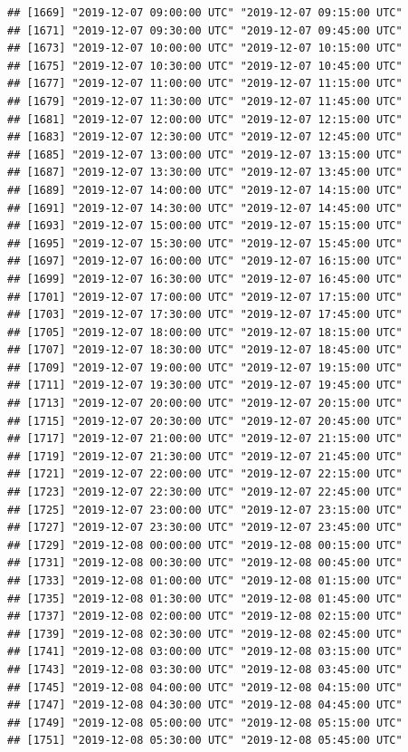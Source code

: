 \documentclass{article}\usepackage[]{graphicx}\usepackage[]{color}
\makeatletter
\newenvironment{kframe}{%
 \def\at@end@of@kframe{}%
 \ifinner\ifhmode%
  \def\at@end@of@kframe{\end{minipage}}%
  \begin{minipage}{\columnwidth}%
 \fi\fi%
 \def\FrameCommand##1{\hskip\@totalleftmargin \hskip-\fboxsep
 \colorbox{shadecolor}{##1}\hskip-\fboxsep
     \hskip-\linewidth \hskip-\@totalleftmargin \hskip\columnwidth}%
 \MakeFramed {\advance\hsize-\width
   \@totalleftmargin\z@ \linewidth\hsize
   \@setminipage}}%
 {\par\unskip\endMakeFramed%
 \at@end@of@kframe}
\newenvironment{knitrout}{}{} %
\makeatother
\begin{document}
\begin{knitrout}
\begin{kframe}
\begin{verbatim}
## [1669] "2019-12-07 09:00:00 UTC" "2019-12-07 09:15:00 UTC"
## [1671] "2019-12-07 09:30:00 UTC" "2019-12-07 09:45:00 UTC"
## [1673] "2019-12-07 10:00:00 UTC" "2019-12-07 10:15:00 UTC"
## [1675] "2019-12-07 10:30:00 UTC" "2019-12-07 10:45:00 UTC"
## [1677] "2019-12-07 11:00:00 UTC" "2019-12-07 11:15:00 UTC"
## [1679] "2019-12-07 11:30:00 UTC" "2019-12-07 11:45:00 UTC"
## [1681] "2019-12-07 12:00:00 UTC" "2019-12-07 12:15:00 UTC"
## [1683] "2019-12-07 12:30:00 UTC" "2019-12-07 12:45:00 UTC"
## [1685] "2019-12-07 13:00:00 UTC" "2019-12-07 13:15:00 UTC"
## [1687] "2019-12-07 13:30:00 UTC" "2019-12-07 13:45:00 UTC"
## [1689] "2019-12-07 14:00:00 UTC" "2019-12-07 14:15:00 UTC"
## [1691] "2019-12-07 14:30:00 UTC" "2019-12-07 14:45:00 UTC"
## [1693] "2019-12-07 15:00:00 UTC" "2019-12-07 15:15:00 UTC"
## [1695] "2019-12-07 15:30:00 UTC" "2019-12-07 15:45:00 UTC"
## [1697] "2019-12-07 16:00:00 UTC" "2019-12-07 16:15:00 UTC"
## [1699] "2019-12-07 16:30:00 UTC" "2019-12-07 16:45:00 UTC"
## [1701] "2019-12-07 17:00:00 UTC" "2019-12-07 17:15:00 UTC"
## [1703] "2019-12-07 17:30:00 UTC" "2019-12-07 17:45:00 UTC"
## [1705] "2019-12-07 18:00:00 UTC" "2019-12-07 18:15:00 UTC"
## [1707] "2019-12-07 18:30:00 UTC" "2019-12-07 18:45:00 UTC"
## [1709] "2019-12-07 19:00:00 UTC" "2019-12-07 19:15:00 UTC"
## [1711] "2019-12-07 19:30:00 UTC" "2019-12-07 19:45:00 UTC"
## [1713] "2019-12-07 20:00:00 UTC" "2019-12-07 20:15:00 UTC"
## [1715] "2019-12-07 20:30:00 UTC" "2019-12-07 20:45:00 UTC"
## [1717] "2019-12-07 21:00:00 UTC" "2019-12-07 21:15:00 UTC"
## [1719] "2019-12-07 21:30:00 UTC" "2019-12-07 21:45:00 UTC"
## [1721] "2019-12-07 22:00:00 UTC" "2019-12-07 22:15:00 UTC"
## [1723] "2019-12-07 22:30:00 UTC" "2019-12-07 22:45:00 UTC"
## [1725] "2019-12-07 23:00:00 UTC" "2019-12-07 23:15:00 UTC"
## [1727] "2019-12-07 23:30:00 UTC" "2019-12-07 23:45:00 UTC"
## [1729] "2019-12-08 00:00:00 UTC" "2019-12-08 00:15:00 UTC"
## [1731] "2019-12-08 00:30:00 UTC" "2019-12-08 00:45:00 UTC"
## [1733] "2019-12-08 01:00:00 UTC" "2019-12-08 01:15:00 UTC"
## [1735] "2019-12-08 01:30:00 UTC" "2019-12-08 01:45:00 UTC"
## [1737] "2019-12-08 02:00:00 UTC" "2019-12-08 02:15:00 UTC"
## [1739] "2019-12-08 02:30:00 UTC" "2019-12-08 02:45:00 UTC"
## [1741] "2019-12-08 03:00:00 UTC" "2019-12-08 03:15:00 UTC"
## [1743] "2019-12-08 03:30:00 UTC" "2019-12-08 03:45:00 UTC"
## [1745] "2019-12-08 04:00:00 UTC" "2019-12-08 04:15:00 UTC"
## [1747] "2019-12-08 04:30:00 UTC" "2019-12-08 04:45:00 UTC"
## [1749] "2019-12-08 05:00:00 UTC" "2019-12-08 05:15:00 UTC"
## [1751] "2019-12-08 05:30:00 UTC" "2019-12-08 05:45:00 UTC"

\end{verbatim}
\end{kframe}
\end{knitrout}
\end{document}
